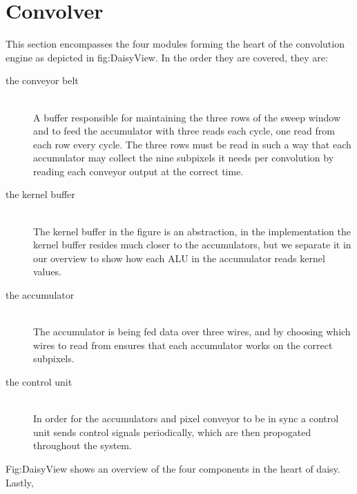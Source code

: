 \section{Convolver}
This section encompasses the four modules forming the heart of the convolution engine as depicted in fig:DaisyView. In the order they are covered, they are:
\begin{description}
    \item[the conveyor belt] \hfill\\ 
        A buffer responsible for maintaining the three rows of the sweep window and to feed the accumulator with three reads each cycle, one read from each row every cycle.
        The three rows must be read in such a way that each accumulator may collect the nine subpixels it needs per convolution by reading each conveyor output at the correct time.
    \item[the kernel buffer] \hfill\\
        The kernel buffer in the figure is an abstraction, in the implementation the kernel buffer resides much closer to the accumulators, but we separate it in our overview to show how each ALU in the accumulator reads kernel values.
    \item[the accumulator] \hfill\\
        The accumulator is being fed data over three wires, and by choosing which wires to read from ensures that each accumulator works on the correct subpixels.
    \item[the control unit] \hfill\\
        In order for the accumulators and pixel conveyor to be in sync a control unit sends control signals periodically, which are then propogated throughout the system.
\end{description}
Fig:DaisyView shows an overview of the four components in the heart of daisy. 
Lastly, 
